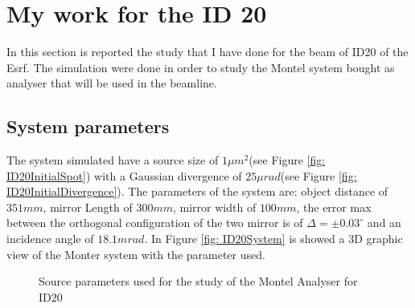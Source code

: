 \section{My work for the ID 20}

In this section is reported the study that I have done for the beam of ID20 of the Esrf. The simulation were done in order to study the Montel system bought as analyser that will be used in the beamline.

\subsection{System parameters}
The system simulated have a source size of $ 1 \mu m^2 $(see Figure \ref{fig: ID20InitialSpot}) with a Gaussian divergence of $25 \mu rad $(see Figure \ref{fig: ID20InitialDivergence}). The parameters of the system are: object distance of $351 mm$, mirror Length of $300mm$, mirror width of $100mm $, the error max between the orthogonal configuration of the two mirror is of $\Delta =  \pm 0.03^{\circ} $ and an incidence angle of $18.1 mrad $. In Figure \ref{fig: ID20System} is showed a 3D graphic view of the Monter system with the parameter used.
\begin{figure}[H]
%
\centering
%
%
\quad
%
\caption{Source parameters used for the study of the Montel Analyser for ID20}
%
\end{figure}

